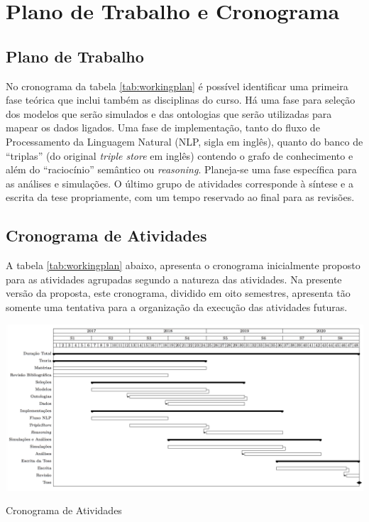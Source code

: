 \documentclass[
	12pt,				%
	openany,			%
	oneside,			%
	a4paper,			%
	english,			%
	french,				%
	spanish,			%
	brazil,				%
	]{abntex2}
\begin{document}
\chapter{Plano de Trabalho e Cronograma}
\section{Plano de Trabalho}
No cronograma da tabela \ref{tab:workingplan} é possível identificar uma primeira fase teórica que inclui também as disciplinas do curso. Há uma fase para seleção dos modelos que serão simulados e das ontologias que serão utilizadas para mapear os dados ligados. Uma fase de implementação, tanto do fluxo de Processamento da Linguagem Natural (NLP, sigla em inglês), quanto do banco de ``triplas'' (do original \emph{triple store} em inglês) contendo o grafo de conhecimento e além do ``raciocínio'' semântico ou \emph{reasoning}. Planeja-se uma fase específica para as análises e simulações. O último grupo de atividades corresponde à síntese e a escrita da tese propriamente, com um tempo reservado ao final para as revisões.

\section{Cronograma de Atividades}
A tabela \ref{tab:workingplan} abaixo, apresenta o cronograma inicialmente proposto para as atividades agrupadas segundo a natureza das atividades. Na presente versão da proposta, este cronograma, dividido em oito semestres, apresenta tão somente uma tentativa para a organização da execução das atividades futuras.
	\begin{table}[h]
		\includegraphics[width=0.90\columnwidth]{timetable_png}
		\caption[Cronograma de Atividades]{Cronograma de Atividades}
		\label{tab:workingplan}
	\end{table}
\end{document}
